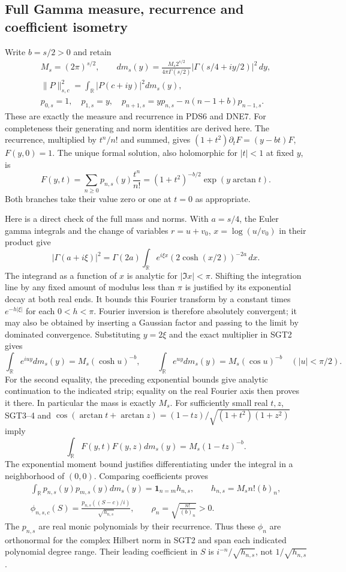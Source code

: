 \documentclass[10pt]{article}
\begin{document}
\subsection{Full Gamma measure, recurrence and coefficient isometry}

Write $b=s/2>0$ and retain
\[
\begin{gathered}
 M_s=(2\pi)^{s/2},\qquad
 dm_s(y)=\frac{M_s2^{s/2}}{4\pi\Gamma(s/2)}
               |\Gamma(s/4+iy/2)|^2\,dy,\\
 \|P\|_{s,c}^2=\int_{\mathbb R}|P(c+iy)|^2dm_s(y),\\
 p_{0,s}=1,\quad p_{1,s}=y,\quad
 p_{n+1,s}=yp_{n,s}-n(n-1+b)p_{n-1,s}.
\end{gathered}\tag{SGT2}
\]
These are exactly the measure and recurrence in PDS6 and DNE7.
For completeness their generating and norm identities are derived here.
The recurrence, multiplied by $t^n/n!$ and summed, gives
$(1+t^2)\partial_t F=(y-bt)F$, $F(y,0)=1$. The unique formal solution,
also holomorphic for $|t|<1$ at fixed $y$, is
\[
 F(y,t)=\sum_{n\ge0}p_{n,s}(y)\frac{t^n}{n!}
       =(1+t^2)^{-b/2}\exp(y\arctan t).
 \tag{SGT3}
\]
Both branches take their value zero or one at $t=0$ as appropriate.

Here is a direct check of the full mass and norms. With $a=s/4$,
the Euler gamma integrals and the change of variables
$r=u+v_0$, $x=\log(u/v_0)$ in their product give
\[
 |\Gamma(a+i\xi)|^2
 =\Gamma(2a)\int_{\mathbb R}e^{i\xi x}
                    (2\cosh(x/2))^{-2a}\,dx .
\]
The integrand as a function of $x$ is analytic for $|\Im x|<\pi$.
Shifting the integration line by any fixed amount of modulus less than
$\pi$ is justified by its exponential decay at both real ends.
It bounds this Fourier transform by a constant times
$e^{-h|\xi|}$ for each $0<h<\pi$. Fourier inversion is therefore
absolutely convergent; it may also be obtained by inserting a Gaussian
factor and passing to the limit by dominated convergence. Substituting
$y=2\xi$ and the exact multiplier in SGT2 gives
\[
 \int_{\mathbb R}e^{iuy}dm_s(y)=M_s(\cosh u)^{-b},
 \qquad
 \int_{\mathbb R}e^{uy}dm_s(y)=M_s(\cos u)^{-b}
 \quad(|u|<\pi/2).
 \tag{SGT4}
\]
For the second equality, the preceding exponential bounds give analytic
continuation to the indicated strip; equality on the real Fourier axis
then proves it there. In particular the mass is exactly $M_s$.
For sufficiently small real $t,z$, SGT3--4 and
$\cos(\arctan t+\arctan z)
 =(1-tz)/\sqrt{(1+t^2)(1+z^2)}$ imply
\[
 \int_{\mathbb R}F(y,t)F(y,z)dm_s(y)=M_s(1-tz)^{-b}.
\]
The exponential moment bound justifies differentiating under the
integral in a neighborhood of $(0,0)$. Comparing coefficients proves
\[
\begin{gathered}
 \int_{\mathbb R}p_{n,s}(y)p_{m,s}(y)dm_s(y)
       =\mathbf1_{n=m}h_{n,s},\qquad
 h_{n,s}=M_sn!(b)_n,\\
 \phi_{n,s,c}(S)=
       \frac{p_{n,s}((S-c)/i)}{\sqrt{h_{n,s}}},\qquad
 \rho_n=\sqrt{\frac{n!}{(b)_n}}>0 .
\end{gathered}\tag{SGT5}
\]
The $p_{n,s}$ are real monic polynomials by their recurrence. Thus these
$\phi_n$ are orthonormal for the complex Hilbert norm in SGT2 and span
each indicated polynomial degree range. Their leading coefficient in
$S$ is $i^{-n}/\sqrt{h_{n,s}}$, not $1/\sqrt{h_{n,s}}$.
\end{document}
